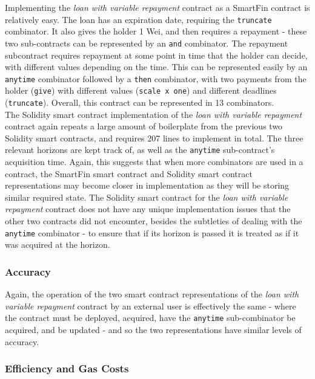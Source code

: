 Implementing the \textit{loan with variable repayment} contract as a SmartFin contract is relatively easy. The loan has an expiration date, requiring the \texttt{truncate} combinator. It also gives the holder 1 Wei, and then requires a repayment - these two sub-contracts can be represented by an \texttt{and} combinator. The repayment subcontract requires repayment at some point in time that the holder can decide, with different values depending on the time. This can be represented easily by an \texttt{anytime} combinator followed by a \texttt{then} combinator, with two payments from the holder (\texttt{give}) with different values (\texttt{scale x one}) and different deadlines (\texttt{truncate}). Overall, this contract can be represented in 13 combinators. \\

The Solidity smart contract implementation of the \textit{loan with variable repayment} contract again repeats a large amount of boilerplate from the previous two Solidity smart contracts, and requires 207 lines to implement in total. The three relevant horizons are kept track of, as well as the \texttt{anytime} sub-contract's acquisition time. Again, this suggests that when more combinators are used in a contract, the SmartFin smart contract and Solidity smart contract representations may become closer in implementation as they will be storing similar required state. The Solidity smart contract for the \textit{loan with variable repayment} contract does not have any unique implementation issues that the other two contracts did not encounter, besides the subtleties of dealing with the \texttt{anytime} combinator - to ensure that if its horizon is passed it is treated as if it was acquired at the horizon.


\subsubsection{Accuracy}

Again, the operation of the two smart contract representations of the \textit{loan with variable repayment} contract by an external user is effectively the same - where the contract must be deployed, acquired, have the \texttt{anytime} sub-combinator be acquired, and be updated - and so the two representations have similar levels of accuracy.


\subsubsection{Efficiency and Gas Costs}

